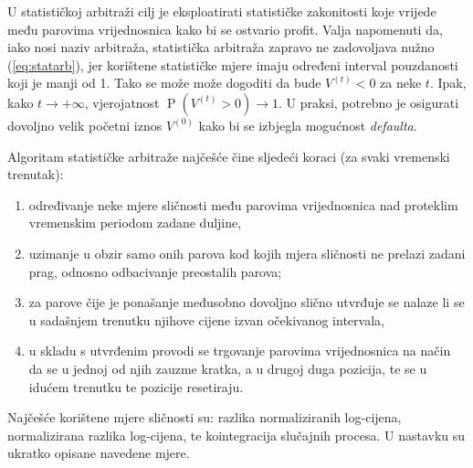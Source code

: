 \documentclass[lmodern, utf8, diplomski, numeric]{fer}
\newcommand{\prob}[1]{\operatorname{P}\left(#1\right)}
\begin{document}
  U statističkoj arbitraži cilj je eksploatirati statističke zakonitosti koje vrijede među parovima vrijednosnica kako bi se ostvario profit.  
  Valja napomenuti da, iako nosi naziv arbitraža, statistička arbitraža zapravo ne zadovoljava nužno (\ref{eq:statarb}), jer korištene statističke mjere imaju određeni interval pouzdanosti koji je manji od 1.
  Tako se može može dogoditi da bude $V^{\left(t\right)} < 0$ za neke $t$.
  Ipak, kako $t \to +\infty$, vjerojatnost $\prob{V^{\left(t\right)} > 0} \to 1$.
  U praksi, potrebno je osigurati dovoljno velik početni iznos $V^{(0)}$ kako bi se izbjegla mogućnost \textit{defaulta}.
  
  Algoritam statističke arbitraže najčešće čine sljedeći koraci (za svaki vremenski trenutak):
  \begin{enumerate}
    \item određivanje neke mjere sličnosti među parovima vrijednosnica nad proteklim vremenskim periodom zadane duljine,
    \item uzimanje u obzir samo onih parova kod kojih mjera sličnosti ne prelazi zadani prag, odnosno odbacivanje preostalih parova;
    \item za parove čije je ponašanje međusobno dovoljno slično utvrđuje se nalaze li se u sadašnjem trenutku njihove cijene izvan očekivanog intervala,
    \item u skladu s utvrđenim provodi se trgovanje parovima vrijednosnica na način da se u jednoj od njih zauzme kratka, a u drugoj duga pozicija, te se u idućem trenutku te pozicije resetiraju.
  \end{enumerate}
  
  Najčešće korištene mjere sličnosti su: razlika normaliziranih log-cijena, normalizirana razlika log-cijena, te kointegracija slučajnih procesa.
  U nastavku su ukratko opisane navedene mjere.
  
\end{document}
